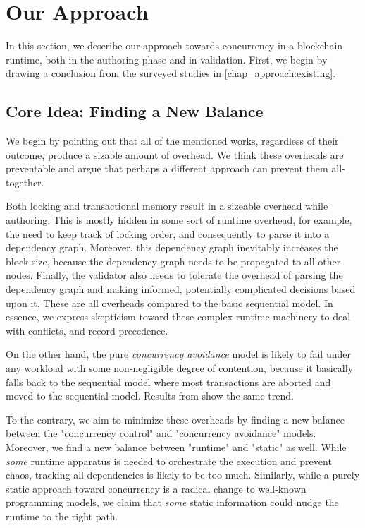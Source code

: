 \section{Our Approach} \label{chap_desgin:sec:our_approach}

In this section, we describe our approach towards concurrency in a blockchain runtime, both in the
authoring phase and in validation. First, we begin by drawing a conclusion from the surveyed studies
in \ref{chap_approach:existing}.

\subsection{Core Idea: Finding a New Balance}

We begin by pointing out that all of the mentioned works, regardless of their outcome, produce a
sizable amount of overhead. We think these overheads are preventable and argue that perhaps a different
approach can prevent them all-together.

Both locking and transactional memory result in a sizeable overhead while authoring. This is mostly
hidden in some sort of runtime overhead, for example, the need to keep track of locking order, and
consequently to parse it into a dependency graph. Moreover, this dependency graph inevitably
increases the block size, because the dependency graph needs to be propagated to all other nodes.
Finally, the validator also needs to tolerate the overhead of parsing the dependency graph and
making informed, potentially complicated decisions based upon it. These are all overheads compared
to the basic sequential model. In essence, we express skepticism toward these complex runtime
machinery to deal with conflicts, and record precedence.

On the other hand, the pure \textit{concurrency avoidance} model is likely to fail under any
workload with some non-negligible degree of contention, because it basically falls back to the
sequential model where most transactions are aborted and moved to the sequential model. Results from
\cite{saraphEmpiricalStudySpeculative2019} show the same trend.

To the contrary, we aim to minimize these overheads by finding a new balance between the
"concurrency control" and "concurrency avoidance" models. Moreover, we find a new balance
between "runtime" and "static" as well. While \textit{some} runtime apparatus is needed to orchestrate the
execution and prevent chaos, tracking all dependencies is likely to be too much. Similarly, while a
purely static approach toward concurrency is a radical change to well-known programming models, we
claim that \textit{some} static information could nudge the runtime to the right path.

